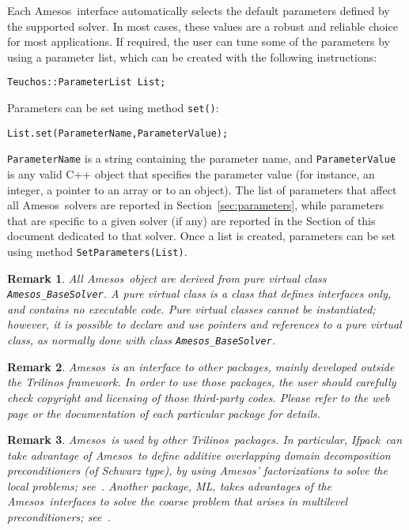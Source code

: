 \documentclass[11pt]{SANDreport}
\newcommand{\amesos}{{\sc Amesos}}
\newcommand{\ml}{{\sc ML}}
\newcommand{\ifpack}{{\sc Ifpack}}
\newcommand{\trilinos}{{\sc Trilinos}}
\newtheorem{remark}{Remark}
\begin{document}
Each \amesos\ interface automatically selects the default
parameters defined by the supported solver. In most cases, these values
are a robust and reliable choice for most applications. If required, the user can
tune some of the parameters by using a parameter
list, which can be created with the following instructions:
\begin{verbatim}
Teuchos::ParameterList List;
\end{verbatim}
Parameters can be set using method \verb!set()!:
\begin{verbatim}
List.set(ParameterName,ParameterValue);
\end{verbatim}
\verb!ParameterName! is a string containing the parameter name,
and \verb!ParameterValue! is any valid C++ object that specifies the
parameter value (for instance, an integer, a pointer to an array or to
an object). The list of parameters that affect all \amesos\ solvers are
reported in Section~\ref{sec:parameters}, while parameters that are specific
to a given solver (if any) are reported in the Section of this document
dedicated to that solver. Once a list is created, parameters can be set using
method \verb!SetParameters(List)!.

\begin{remark}
All \amesos\ object are derived from pure virtual class 
\verb!Amesos_BaseSolver!. A pure virtual class is a class that
defines interfaces only, and contains no executable code. Pure virtual classes cannot
be instantiated; however, it is possible to declare and use pointers and
references to a pure virtual class, as normally done with class
{\tt Amesos\_BaseSolver}.
\end{remark}  

\begin{remark}
\amesos\ is an interface to other
  packages, mainly developed outside the Trilinos framework. In order to
  use those packages, the user should carefully check copyright and
  licensing of those third-party codes.  Please refer to the web page or
  the documentation of each particular package for details.
\end{remark}  
  
\begin{remark}
\amesos\ is used by other \trilinos\ packages. In particular, \ifpack\
  can take advantage of \amesos\ to define additive overlapping domain
  decomposition preconditioners (of Schwarz type), by using \amesos'
  factorizations to solve the local problems; see~\cite{ifpack-guide}.
Another package, \ml, takes
advantages of the \amesos\ interfaces to solve the coarse problem
that arises in multilevel preconditioners; see~\cite{ml-guide}.
\end{remark}
\end{document}

